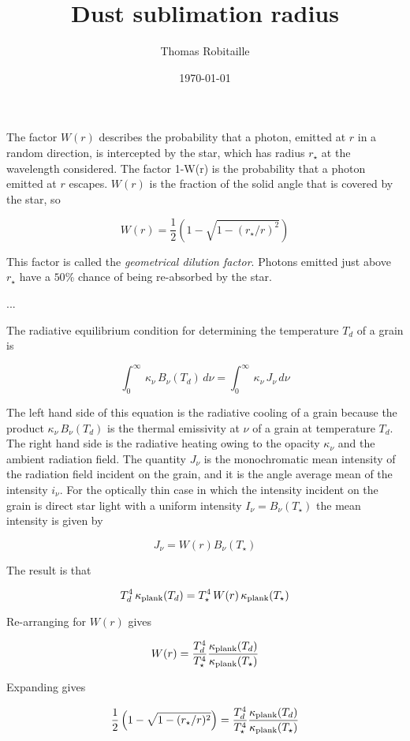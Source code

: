 \documentclass[11pt]{article}
\begin{document}
\title{Dust sublimation radius}
\author{Thomas Robitaille}
\date{\today}
\maketitle

The factor $W(r)$ describes the probability that a photon, emitted at $r$ in a random direction, is intercepted by the star, which has radius $r_\star$ at the wavelength considered. The factor 1-W(r) is the probability that a photon emitted at $r$ escapes. $W(r)$ is the fraction of the solid angle that is covered by the star, so

$$
W(r) = \frac{1}{2}\left(1-\sqrt{1-(r_{\star}/r)^2}\right)
$$

This factor is called the \textit{geometrical dilution factor}. Photons emitted just above $r_\star$ have a $50$\% chance of being re-absorbed by the star.

...

The radiative equilibrium condition for determining the temperature $T_d$ of a grain is

$$
\int_0^\infty\,\kappa_\nu\,B_\nu(T_d)\,d\nu = \int_0^\infty\,\kappa_\nu\,J_\nu\,d\nu
$$

The left hand side of this equation is the radiative cooling of a grain because the product $\kappa_\nu\,B_\nu(T_d)$ is the thermal emissivity at $\nu$ of a grain at temperature $T_d$. The right hand side is the radiative heating owing to the opacity $\kappa_\nu$ and the ambient radiation field. The quantity $J_\nu$ is the monochromatic mean intensity of the radiation field incident on the grain, and it is the angle average mean of the intensity $i_\nu$. For the optically thin case in which the intensity incident on the grain is direct star light with a uniform intensity $I_\nu=B_\nu(T_\star)$ the mean intensity is given by

$$
J_\nu = W(r) B_\nu(T_\star)
$$

The result is that

$$
T_d^4\,\kappa_{\rm plank}(T_d) = T_\star^4\,W(r)\,\kappa_{\rm plank}(T_\star)
$$

Re-arranging for $W(r)$ gives

$$
W(r) = \frac{T_d^4}{T_\star^4}\frac{\kappa_{\rm plank}(T_d)}{\kappa_{\rm plank}(T_\star)}
$$

Expanding gives

$$
 \frac{1}{2}\left(1-\sqrt{1-(r_{\star}/r)^2}\right) = \frac{T_d^4}{T_\star^4}\frac{\kappa_{\rm plank}(T_d)}{\kappa_{\rm plank}(T_\star)}
$$
\end{document}

